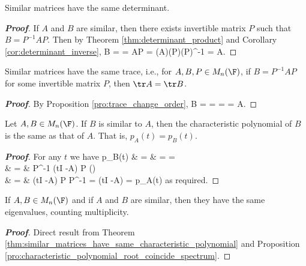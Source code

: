 \begin{proposition}
Similar matrices have the same determinant.
\end{proposition}

\begin{proof}[\bf Proof]
If $A$ and $B$ are similar, then there exists invertible matrix $P$ such that $B= P^{-1}AP$. Then by Theorem \ref{thm:determinant_product} and Corollary \ref{cor:determinant_inverse},
\be
\det B = \det{} = \det {} \det A\det P = (\det A)(\det P)(\det P)^{-1} = \det A.
\ee
\end{proof}


\begin{proposition}
Similar matrices have the same trace, i.e., for $A,B,P\in M_n(\F)$, if $B = P^{-1}AP$ for some invertible matrix $P$, then $\tr A = \tr B$.
\end{proposition}

\begin{proof}[\bf Proof]
By Proposition \ref{pro:trace_change_order},
\be
\tr B = \tr{} = \tr{} = \tr{} = \tr A.
\ee
\end{proof}

\begin{theorem}\label{thm:similar_matrices_have_same_characteristic_polynomial}
Let $A,B\in M_n(\F)$. If $B$ is similar to $A$, then the characteristic polynomial of $B$ is the same as that of $A$. That is, $p_A(t) = p_B(t)$.
\end{theorem}

\begin{proof}[\bf Proof]
For any $t$ we have
\beast
p_B(t) & = & \det{} = \det{} = \det{} \\
& = &  \det P^{-1} \det(tI -A) \det P \qquad () \\
& = &  \det(tI -A) \det P \det P^{-1} = \det(tI -A) = p_A(t)
\eeast
as required.
\end{proof}

\begin{corollary}\label{cor:similarity_same_eigenvalues}
If $A,B\in M_n(\F)$ and if $A$ and $B$ are similar, then they have the same eigenvalues, counting multiplicity.
\end{corollary}

\begin{proof}[\bf Proof]
Direct result from Theorem \ref{thm:similar_matrices_have_same_characteristic_polynomial} and Proposition \ref{pro:characteristic_polynomial_root_coincide_spectrum}.
\end{proof}

